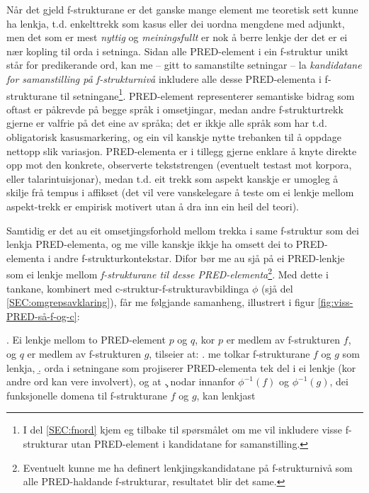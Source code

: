 \documentclass[11pt,a4paper,oneside,draft]{book}
\begin{document}
Når det gjeld f-strukturane er det ganske mange element me teoretisk
sett kunne ha lenkja, t.d. enkelttrekk som kasus eller dei uordna
mengdene med adjunkt, men det som er mest \emph{nyttig} og \emph{meiningsfullt}
er nok å berre lenkje der det er ei nær kopling til orda i
setninga. Sidan alle PRED-element i ein f-struktur unikt står for
predikerande ord, kan me -- gitt to samanstilte setningar -- la
\emph{kandidatane for samanstilling på f-strukturnivå} inkludere alle
desse PRED-elementa i f-strukturane til
setningane\footnote{I del \ref{SEC:fnord} kjem eg tilbake til spørsmålet om me vil
        inkludere visse f-strukturar utan PRED-element i kandidatane
        for samanstilling. }. PRED-element representerer semantiske bidrag som
oftast er påkrevde på begge språk i omsetjingar, medan andre
f-strukturtrekk gjerne er valfrie på det eine av språka; det er ikkje
alle språk som har t.d. obligatorisk kasusmarkering, og ein vil
kanskje nytte trebanken til å oppdage nettopp slik variasjon.
PRED-elementa er i tillegg gjerne enklare å knyte direkte opp mot den
konkrete, observerte tekststrengen (eventuelt testast mot korpora,
eller talarintuisjonar), medan t.d. eit trekk som aspekt kanskje er
umogleg å skilje frå tempus i affikset (det vil vere vanskelegare å
teste om ei lenkje mellom aspekt-trekk er empirisk motivert utan å dra
inn ein heil del teori).

Samtidig er det au eit omsetjingsforhold mellom trekka i same
f-struktur som dei lenkja PRED-elementa, og me ville kanskje ikkje ha
omsett dei to PRED-elementa i andre f-strukturkontekstar. Difor bør me
au sjå på ei PRED-lenkje som ei lenkje mellom \emph{f-strukturane til
desse PRED-elementa}\footnote{Eventuelt kunne me ha definert lenkjingskandidatane på
       f-strukturnivå som alle PRED-haldande f-strukturar, resultatet
       blir det same. }.  Med dette i tankane, kombinert med
c-struktur-f-strukturavbildinga $\phi$ (sjå del
\ref{SEC:omgrepsavklaring}), får me følgjande samanheng, illustrert i
figur \ref{fig:viss-PRED-så-f-og-c}:

\ex. \label{f-links} Ei lenkje mellom to PRED-element $p$ og $q$, kor
      $p$ er medlem av f-strukturen $f$, og $q$ er medlem av
      f-strukturen $g$, tilseier at:
\a. \label{f-links-substr} me tolkar f-strukturane $f$ og $g$ som lenkja,
\b. \label{f-links-words} orda i setningane som projiserer
     PRED-elementa tek del i ei lenkje (kor andre
     ord kan vere involvert), og at
\c. \label{f-links-domain} nodar innanfor $\phi^{-1}(f)$
     og $\phi^{-1}(g)$, dei funksjonelle domena til f-strukturane $f$
     og $g$, kan lenkjast
\end{document}
